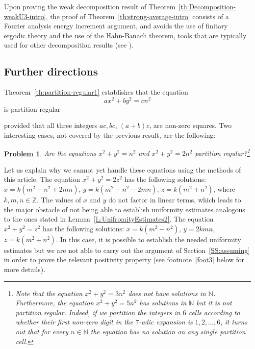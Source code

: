 \documentclass[11pt]{amsart}
\newtheorem{problem}{Problem}
\theoremstyle{definition}
\begin{document}
Upon proving the weak decomposition result of
Theorem~\ref{th:Decomposition-weakU3-intro}, the proof of
Theorem~\ref{th:strong-average-intro}  consists of a Fourier
analysis energy increment argument, and  avoids the use of finitary
ergodic theory  and  the use of the Hahn-Banach theorem, tools that
are typically used  for other decomposition results (see \cite{G10,
GW11,GW11b, GT10, T06}).

\subsection{Further directions}
Theorem~\ref{th:partition-regular1} establishes that the equation
\begin{equation}\label{eq:basic1}
ax^2+by^2=cn^2
\end{equation}
 is partition regular
 
 provided that all three integers
  $ac, bc$, $(a+b)c$,  are non-zero squares.
Two interesting
cases, not covered by the previous result,  are the following:
\begin{problem}\label{prob1}
Are the equations $x^2+y^2=n^2$ and $x^2+y^2=2n^2$ partition
regular?\footnote{Note that the equation $x^2+y^2=3n^2$ does not have solutions in ${{\mathbb N}}$.
Furthermore, the equation $x^2+y^2=5n^2$  has solutions in ${{\mathbb N}}$ but it is not
partition regular. Indeed, if we partition the integers in $6$ cells
according to whether their first non-zero digit in the $7$-adic
expansion is $1,2,\ldots, 6$, it turns out  that for every
$n\in {{\mathbb N}}$ the equation has no solution on any single partition
cell.}
\end{problem}
 Let us explain why we cannot yet handle these equations using the methods
 of this article. The equation
$x^2+y^2=2z^2$ has the following solutions: $x=k(m^2-n^2+2mn)$,
$y=k(m^2-n^2-2mn)$, $z=k(m^2+n^2)$, where $k,m,n\in {{\mathbb Z}}$. The values
of $x$ and $y$ do not factor in linear terms, which leads to the
major obstacle of not being able to establish uniformity estimates
analogous to the ones stated in Lemma~\ref{L:UnifromityEstimates2}.
The equation $x^2+y^2=z^2$ has the following solutions:
$x=k(m^2-n^2)$, $y=2kmn$, $z=k(m^2+n^2)$. In this case, it is
possible to  establish the needed uniformity estimates but we are
not able to carry out the argument of Section~\ref{SS:assuming}
 in order to prove the relevant positivity property (see footnote~\ref{foot3} below for more details).
\end{document}
